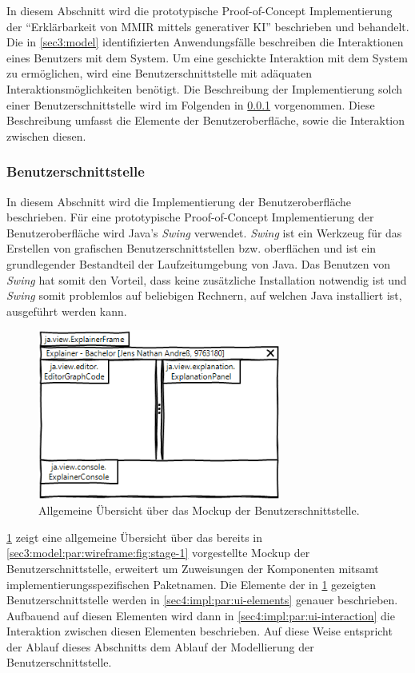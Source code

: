 In diesem Abschnitt wird die prototypische Proof-of-Concept Implementierung der \enquote{Erklärbarkeit von MMIR mittels generativer KI} beschrieben und behandelt.
Die in \cref{sec3:model} identifizierten Anwendungsfälle beschreiben die Interaktionen eines Benutzers mit dem System.
Um eine geschickte Interaktion mit dem System zu ermöglichen, wird eine Benutzerschnittstelle mit adäquaten Interaktionsmöglichkeiten benötigt.
Die Beschreibung der Implementierung solch einer Benutzerschnittstelle wird im Folgenden in \cref{sec4:impl:subsubsec:ui} vorgenommen.
Diese Beschreibung umfasst die Elemente der Benutzeroberfläche, sowie die Interaktion zwischen diesen.

\subsubsection{Benutzerschnittstelle}
\label{sec4:impl:subsubsec:ui}
In diesem Abschnitt wird die Implementierung der Benutzeroberfläche beschrieben.
Für eine prototypische Proof-of-Concept Implementierung der Benutzeroberfläche wird Java's \textit{Swing} verwendet.
\textit{Swing} ist ein Werkzeug für das Erstellen von grafischen Benutzerschnittstellen bzw. oberflächen und ist ein grundlegender Bestandteil der Laufzeitumgebung von Java.
Das Benutzen von \textit{Swing} hat somit den Vorteil, dass keine zusätzliche Installation notwendig ist und \textit{Swing} somit problemlos auf beliebigen Rechnern, auf welchen Java installiert ist, ausgeführt werden kann.
\begin{figure}[!ht]
  \includegraphics[width=8cm]{chapter/chapter_4/wireframe-impl-overview}
  \caption{Allgemeine Übersicht über das Mockup der Benutzerschnittstelle.}
  \label{sec4:impl:subsubsec:ui:fig:wireframe-overview}
\end{figure}

\cref{sec4:impl:subsubsec:ui:fig:wireframe-overview} zeigt eine allgemeine Übersicht über das bereits in \cref{sec3:model:par:wireframe:fig:stage-1} vorgestellte Mockup der Benutzerschnittstelle, erweitert um Zuweisungen der Komponenten mitsamt implementierungsspezifischen Paketnamen.
Die Elemente der in \cref{sec4:impl:subsubsec:ui:fig:wireframe-overview} gezeigten Benutzerschnittstelle werden in \cref{sec4:impl:par:ui-elements} genauer beschrieben.
Aufbauend auf diesen Elementen wird dann in \cref{sec4:impl:par:ui-interaction} die Interaktion zwischen diesen Elementen beschrieben.
Auf diese Weise entspricht der Ablauf dieses Abschnitts dem Ablauf der Modellierung der Benutzerschnittstelle.

